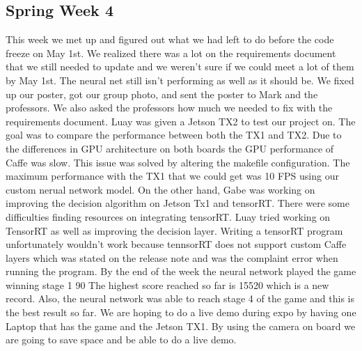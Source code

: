 \documentclass[onecolumn, draftclsnofoot,10pt, compsoc]{IEEEtran}
\begin{document}
\subsection{Spring Week 4}
This week we met up and figured out what we had left to do before the code freeze on May 1st.
We realized there was a lot on the requirements document that we still needed to update and we weren't sure if we could meet a lot of them by May 1st.
The neural net still isn't performing as well as it should be.
We fixed up our poster, got our group photo, and sent the poster to Mark and the professors.
We also asked the professors how much we needed to fix with the requirements document.
\newline\newline
Luay was given a Jetson TX2 to test our project on.
The goal was to compare the performance between both the TX1 and TX2.
Due to the differences in GPU architecture on both boards the GPU performance of Caffe was slow.
This issue was solved by altering the makefile configuration.
The maximum performance with the TX1 that we could get was 10 FPS using our custom nerual network model.
On the other hand, Gabe was working on improving the decision algorithm on Jetson Tx1 and tensorRT.
There were some difficulties finding resources on integrating tensorRT.
Luay tried working on TensorRT as well as improving the decision layer.
Writing a tensorRT program unfortunately wouldn't work because tennsorRT does not support custom Caffe layers which was stated on the release note and was the complaint error when running the program.
\newline\newline
By the end of the week the neural network played the game winning stage 1 90%
The highest score reached so far is 15520 which is a new record.
Also, the neural network was able to reach stage 4 of the game and this is the best result so far.
We are hoping to do a live demo during expo by having one Laptop that has the game and the Jetson TX1.
By using the camera on board we are going to save space and be able to do a live demo.
\end{document}
